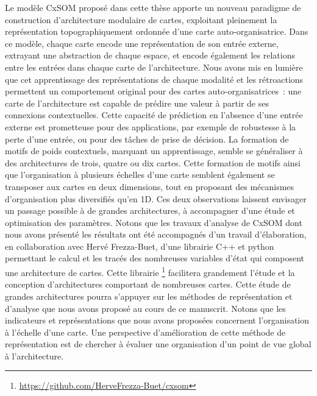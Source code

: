 Le modèle CxSOM proposé dans cette thèse apporte un nouveau paradigme de construction d'architecture modulaire de cartes, exploitant pleinement la représentation topographiquement ordonnée d'une carte auto-organisatrice.
Dans ce modèle, chaque carte encode une représentation de son entrée externe, extrayant une abstraction de chaque espace, et encode également les relations entre les entrées dans chaque carte de l'architecture. 
Nous avons mis en lumière que cet apprentissage des représentations de chaque modalité et les rétroactions permettent un comportement original pour des cartes auto-organisatrices~: une carte de l'architecture est capable de prédire une valeur à partir de ses connexions contextuelles. Cette capacité de prédiction en l'absence d'une entrée externe est prometteuse pour des applications, par exemple de robustesse à la perte d'une entrée, ou pour des tâches de prise de décision.
La formation de motifs de poids contextuels, marquant un apprentissage, semble se généraliser à des architectures de trois, quatre ou dix cartes.
Cette formation de motifs ainsi que l'organisation à plusieurs échelles d'une carte semblent également se transposer aux cartes en deux dimensions, tout en proposant des mécanismes d'organisation plus diversifiés qu'en 1D.
Ces deux observations laissent envisager un passage possible à de grandes architectures, à accompagner d'une étude et optimisation des paramètres. 
Notons que les travaux d'analyse de CxSOM dont nous avons présenté les résultats ont été accompagnés d'un travail d'élaboration, en collaboration avec Hervé Frezza-Buet, d'une librairie C++ et python permettant le calcul et les tracés des nombreuses variables d'état qui composent une architecture de cartes.
Cette librairie \footnote{\url{https://github.com/HerveFrezza-Buet/cxsom}} facilitera grandement l'étude et la conception d'architectures comportant de nombreuses cartes.
Cette étude de grandes architectures pourra s'appuyer sur les méthodes de représentation et d'analyse que nous avons proposé au cours de ce manuscrit. Notons que les indicateurs et représentations que nous avons proposées concernent l'organisation à l'échelle d'une carte. Une perspective d'amélioration de cette méthode de représentation est de chercher à évaluer une organisation d'un point de vue global à l'architecture.

